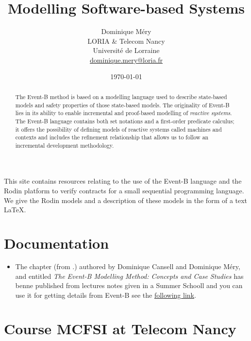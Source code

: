 \documentclass[ 12pt]{article}
\title{Modelling Software-based Systems}
\author{Dominique M\'ery\\
LORIA \& Telecom Nancy\\ Universit\'e de Lorraine\\ \url{dominique.mery@loria.fr}}
\date{\today}
\begin{document}
  \setcounter{ex}{1}
\maketitle

\begin{abstract}

  The Event-B  method is based on a modelling
 language used to describe state-based models and  safety
 properties of those state-based models.  The originality of  Event-B
 lies in its ability  to
 enable incremental and proof-based modelling of \textit{reactive
   systems}. The  Event-B   language contains both set notations and a
 first-order predicate calculus; it offers the possibility of defining
 models of reactive systems called machines and contexts and includes
  the refinement relationship that allows us to follow an incremental
  development methodology.  
  
\end{abstract}

This site contains resources relating to the use of the Event-B
language and the Rodin platform to verify contracts for a small
sequential programming language.  We give the Rodin models and a
description of these models in the form of a text \LaTeX.


\section{Documentation}




\begin{itemize}
\item  The chapter \cite{losl-b} (from \cite{losl-eatcs}.)  authored by Dominique Cansell and
  Dominique M{\'e}ry, and entitled  \textit{The Event-B Modelling
  Method: Concepts and Case        Studies} has benne published from
lectures notes given in a Summer Schooll and you can use it for
getting details from  Event-B   see  the  \href{http://mery54.github.io/teaching/mosos/lecturesnotes/BasicEventB.pdf}{following
  link}.
  
\end{itemize}
\section{Course MCFSI  at Telecom Nancy}
\label{sec:course-mcfsi-at}
\end{document}
